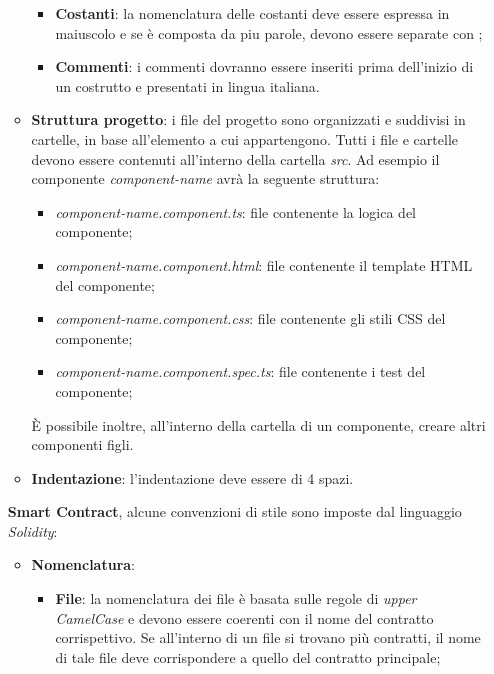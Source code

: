 \begin{itemize}
\begin{itemize}
\begin{itemize}
            \item \textbf{Costanti}: la nomenclatura delle costanti deve essere espressa in maiuscolo e se è composta da piu parole, devono essere separate con \textit{\textunderscore};
            \item \textbf{Commenti}: i commenti dovranno essere inseriti prima dell’inizio di un  costrutto e presentati in
            lingua italiana.
        \end{itemize}
        \item \textbf{Struttura progetto}: i file del progetto sono organizzati e suddivisi in cartelle, in base all'elemento a cui appartengono. \newline
        Tutti i file e cartelle devono essere contenuti all'interno della cartella \textit{src}. \newline
        Ad esempio il componente \textit{component-name} avrà la seguente struttura:
        \begin{itemize}
            \item \textit{component-name.component.ts}: file contenente la logica del componente;
            \item \textit{component-name.component.html}: file contenente il template HTML del componente;
            \item \textit{component-name.component.css}: file contenente gli stili CSS del componente;
            \item \textit{component-name.component.spec.ts}: file contenente i test del componente;
        \end{itemize}
        È possibile inoltre, all'interno della cartella di un componente, creare altri componenti figli.
        \item \textbf{Indentazione}: l'indentazione deve essere di 4 spazi.
    \end{itemize}
    \textbf{Smart Contract}, alcune convenzioni di stile sono imposte dal linguaggio \textit{Solidity}:
    \begin{itemize}
        \item \textbf{Nomenclatura}:
        \begin{itemize}
            \item \textbf{File}: la nomenclatura dei file è basata sulle regole di \textit{upper CamelCase} e devono essere coerenti con il nome del contratto corrispettivo. \newline
            Se all'interno di un file si trovano più contratti, il nome di tale file deve corrispondere a quello del contratto principale;

\end{itemize}
\end{itemize}
\end{itemize}
